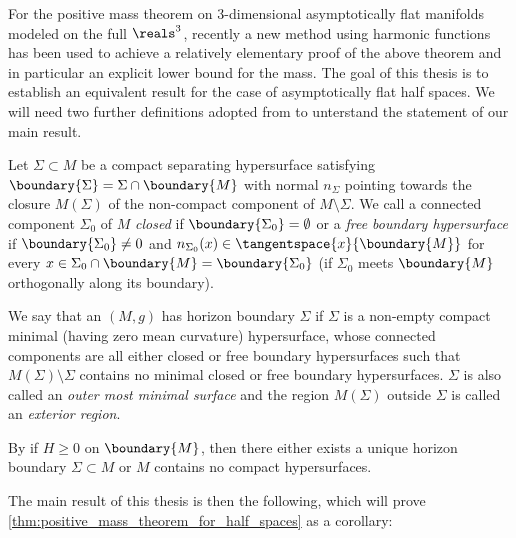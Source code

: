 \documentclass[titlepage,numbers=noenddot,headinclude,oneside,%
footinclude=true,cleardoublepage=empty,%
BCOR=5mm,paper=a4,fontsize=11pt,%
english,%
]{scrartcl}
\begin{document}
For the positive mass theorem on 3-dimensional asymptotically flat manifolds modeled on the full \( \reals^3 \), recently \parencite{brayHarmonicFunctionsMass2019} a new method using harmonic functions has been used to achieve a relatively elementary proof of the above theorem and in particular an explicit lower bound for the mass. The goal of this thesis is to establish an equivalent result for the case of asymptotically flat half spaces. We will need two further definitions adopted from \cite{eichmairDoublingAsymptoticallyFlat2023} to unterstand the statement of our main result.
\begin{definition}
    Let \( \Sigma\subset M  \) be a compact separating hypersurface satisfying \( \boundary{\Sigma}=\Sigma\cap \boundary{M} \) with normal \( n_\Sigma \) pointing towards the closure \( M(\Sigma) \) of the non-compact component of \( M\setminus \Sigma \). We call a connected component \( \Sigma_0 \) of \( M \) \emph{closed} if \( \boundary{\Sigma_0}=\emptyset \) or a \emph{free boundary hypersurface} if \( \boundary{\Sigma_0}\neq 0 \) and \( n_{\Sigma_0}(x)\in \tangentspace{x}{\boundary{M}} \) for every \( x\in \Sigma_0\cap \boundary{M}=\boundary{\Sigma_0} \) (\ie if \( \Sigma_0 \) meets \( \boundary{M} \) orthogonally along its boundary).

    We say that an \( (M,g) \) has horizon boundary \( \Sigma \) if \( \Sigma \) is a non-empty compact minimal (\ie having zero mean curvature) hypersurface, whose connected components are all either closed or free boundary hypersurfaces such that \( M(\Sigma)\setminus \Sigma \) contains no minimal closed or free boundary hypersurfaces. \( \Sigma \) is also called an \emph{outer most minimal surface} and the region \( M(\Sigma) \) outside \( \Sigma \) is called an \emph{exterior region}.
\end{definition}
\begin{remark}\label{rem:exterior_region_existence}
    By \cite[Lemma 2.3]{koerberRiemannianPenroseInequality2020} if \( H\geq 0 \) on \( \boundary{M} \), then there either exists a unique horizon boundary \( \Sigma\subset M \) or \( M \) contains no compact hypersurfaces.
\end{remark}
The main result of this thesis is then the following, which will prove \cref{thm:positive_mass_theorem_for_half_spaces} as a corollary:
\end{document}
